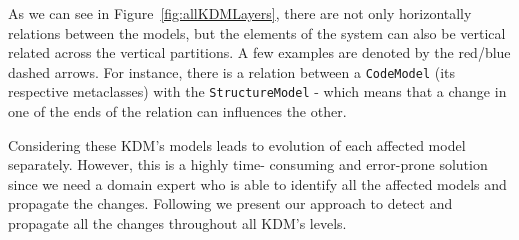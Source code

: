 As we can see in Figure~\ref{fig:allKDMLayers}, there are not only horizontally relations between the models, but the elements of the system can also be vertical related across the vertical partitions. A few examples are denoted by the red/blue dashed arrows. For instance, there is a relation between a \texttt{CodeModel} (its respective metaclasses) with the \texttt{StructureModel} - which means that a change in one of the ends of the relation can influences the other.

Considering these KDM's models leads to evolution of each affected model separately. However, this is a highly time- consuming and error-prone solution since we need a domain expert who is able to identify all the affected models and propagate the changes. Following we present our approach to detect and propagate all the changes throughout all KDM's levels.

